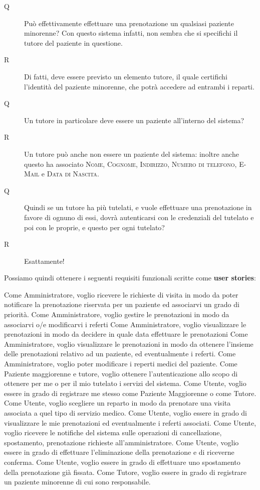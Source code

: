 \begin{description}
\item[Q] Può effettivamente effettuare una prenotazione un qualsiasi paziente
minorenne? Con questo sistema infatti, non sembra che si specifichi il tutore
del paziente in questione.
\item[R] Di fatti, deve essere previsto un elemento tutore, il quale certifichi
l'identità del paziente minorenne, che potrà accedere ad entrambi i reparti.
\medskip

\item[Q] Un tutore in particolare deve essere un paziente all'interno del sistema?
\item[R] Un tutore può anche non essere un paziente del sistema: inoltre anche
questo ha associato \textsc{Nome, Cognome, Indirizzo, Numero di telefono, E-Mail} 
e \textsc{Data di Nascita}. 
\medskip

\item[Q] Quindi se un tutore ha più tutelati, e vuole effettuare una prenotazione 
	in favore di ognuno di essi, dovrà autenticarsi con le credenziali del 
	tutelato e poi con le proprie, e questo per ogni tutelato?
\item[R] Esattamente!
\end{description} 

Possiamo quindi ottenere i seguenti requisiti funzionali scritte come \textbf{user stories}:
\begin{itemize}
\diam Come Amministratore, voglio ricevere le richieste di visita in modo da poter
	notificare la prenotazione riservata per un paziente ed associarvi un
	grado di priorità.
\diam Come Amministratore, voglio gestire le prenotazioni in modo da associarvi
	o/e modificarvi i referti
\diam Come Amministratore, voglio visualizzare le prenotazioni in modo da decidere
	in quale data effettuare le prenotazioni
\diam Come Amministratore, voglio visualizzare le prenotazioni in modo da ottenere
	l'insieme delle prenotazioni relativo ad un paziente, ed eventualmente i
	referti.
\diam Come Amministratore, voglio poter modificare i reperti medici del paziente.
\diam Come Paziente maggiorenne e tutore, voglio ottenere l'autenticazione allo
	scopo di ottenere per me o per il mio tutelato i servizi del sistema.
\diam Come Utente, voglio essere in grado di registrare me stesso come Paziente
	Maggiorenne o come Tutore.
\diam Come Utente, voglio scegliere un reparto in modo da prenotare una visita
	associata a quel tipo di servizio medico.
\diam Come Utente, voglio essere in grado di visualizzare le mie prenotazioni
	ed eventualmente i referti associati.
\diam Come Utente, voglio ricevere le notifiche del sistema sulle operazioni
	di cancellazione, spostamento, prenotazione richieste all'amministratore.
\diam Come Utente, voglio essere in grado di effettuare l'eliminazione della
	prenotazione e di riceverne conferma.
\diam Come Utente, voglio essere in grado di effettuare uno spostamento della
	prenotazione già fissata.
\diam Come Tutore, voglio essere in grado di registrare un paziente minorenne di
	cui sono responsabile.

\end{itemize}


